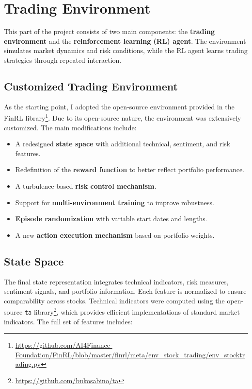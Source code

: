 \documentclass[12pt,a4paper]{report}
\begin{document}
\section{Trading Environment}
\label{sec:rl_env}

This part of the project consists of two main components: the \textbf{trading environment} and the \textbf{reinforcement learning (RL) agent}. The environment simulates market dynamics and risk conditions, while the RL agent learns trading strategies through repeated interaction.

\subsection{Customized Trading Environment}
As the starting point, I adopted the open-source environment provided in the FinRL library\footnote{\url{https://github.com/AI4Finance-Foundation/FinRL/blob/master/finrl/meta/env_stock_trading/env_stocktrading.py}}. Due to its open-source nature, the environment was extensively customized. The main modifications include:
\begin{itemize}
    \item A redesigned \textbf{state space} with additional technical, sentiment, and risk features.
    \item Redefinition of the \textbf{reward function} to better reflect portfolio performance.
    \item A turbulence-based \textbf{risk control mechanism}.
    \item Support for \textbf{multi-environment training} to improve robustness.
    \item \textbf{Episode randomization} with variable start dates and lengths.
    \item A new \textbf{action execution mechanism} based on portfolio weights.
\end{itemize}

\subsection{State Space}
The final state representation integrates technical indicators, risk measures, sentiment signals, and portfolio information. Each feature is normalized to ensure comparability across stocks. Technical indicators were computed using the open-source \texttt{ta} library\footnote{\url{https://github.com/bukosabino/ta}}, which provides efficient implementations of standard market indicators. The full set of features includes:
\end{document}
